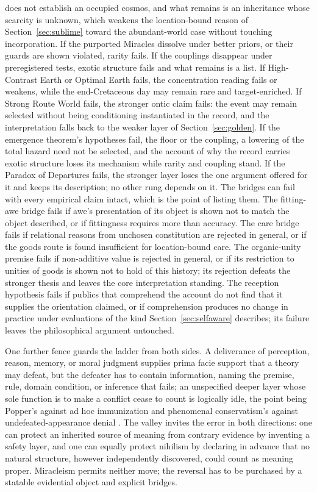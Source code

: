 does not establish an occupied cosmos, and what remains is an inheritance
whose scarcity is unknown, which weakens the location-bound reason of
Section~\ref{sec:sublime} toward the abundant-world case without touching
incorporation. If the purported Miracles dissolve under better priors, or
their guards are shown violated, rarity fails. If the couplings disappear
under preregistered tests, exotic structure fails and what remains is a list.
If High-Contrast Earth or Optimal Earth fails, the concentration reading fails
or weakens, while the end-Cretaceous day may remain rare and target-enriched.
If Strong Route World fails, the stronger ontic claim fails: the event may
remain selected without being conditioning instantiated in the record, and the
interpretation falls back to the weaker layer of Section~\ref{sec:golden}.
If the emergence theorem's hypotheses fail, the floor or the coupling, a
lowering of the total hazard need not be selected, and the account of why
the record carries exotic structure loses its mechanism while rarity and
coupling stand. If the Paradox of Departures fails, the stronger layer loses
the one argument offered for it and keeps its description; no other rung
depends on it. The
bridges can fail with every empirical claim intact, which is the point of
listing them. The fitting-awe bridge fails if awe's presentation of its object
is shown not to match the object described, or if fittingness requires more
than accuracy. The care bridge fails if relational reasons from unchosen
constitution are rejected in general, or if the goods route is found
insufficient for location-bound care. The organic-unity premise fails if non-additive value is
rejected in general, or if its restriction to unities of goods is shown not
to hold of this history; its rejection defeats the stronger thesis and leaves
the core interpretation standing. The reception hypothesis fails if publics that comprehend
the account do not find that it supplies the orientation claimed, or if
comprehension produces no change in practice under evaluations of the kind
Section~\ref{sec:selfaware} describes; its failure leaves the philosophical
argument untouched.

One further fence guards the ladder from both sides. A deliverance of
perception, reason, memory, or moral judgment supplies prima facie support
that a theory may defeat, but the defeater has to contain information, naming
the premise, rule, domain condition, or inference that fails; an unspecified
deeper layer whose sole function is to make a conflict cease to count is
logically idle, the point being Popper's against ad hoc immunization
\cite{Popper63} and phenomenal conservatism's against undefeated-appearance
denial \cite{Huemer07}. The valley invites the error in both directions: one
can protect an inherited source of meaning from contrary evidence by inventing
a safety layer, and one can equally protect nihilism by declaring in advance
that no natural structure, however independently discovered, could count as
meaning proper. Miracleism permits neither move; the reversal has to be
purchased by a statable evidential object and explicit bridges.

